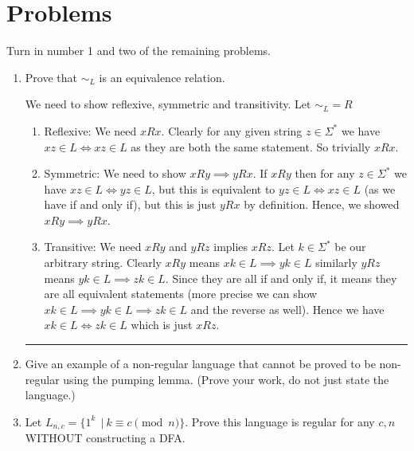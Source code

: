 \documentclass[11pt]{article}
\newenvironment{proof}{{\bf Proof:}}{\hfill\rule{2mm}{2mm}}
\begin{document}
\section{Problems}
Turn in number 1 and two of the remaining problems.
\begin{enumerate}
    \item Prove that $\sim_L$ is an equivalence relation.

        \begin{proof}
            We need to show reflexive, symmetric and transitivity. Let $\sim_L = R$

            \begin{enumerate}
                \item Reflexive: We need $xRx$. Clearly for any given string $z\in \Sigma^{*}$ we have $xz \in L \iff xz \in L$ as they are both the same statement. So trivially $xRx$.
                \item Symmetric: We need to show $xRy \implies yRx$. If $xRy$ then for any $z \in \Sigma^{*}$ we have $xz \in L \iff yz \in L$, but this is equivalent to $yz \in L\iff xz \in L$ (as we have if and only if), but this is just $yRx$ by definition. Hence, we showed $xRy \implies yRx$.
                \item Transitive: We need $xRy$ and $yRz$ implies $xRz$. Let $k \in \Sigma^{*}$ be our arbitrary string.  Clearly $xRy$ means $xk \in L \implies yk \in L$ similarly $yRz$ means $yk \in L \implies zk \in L$. Since they are all if and only if, it means they are all equivalent statements (more precise we can show $xk \in L \implies yk \in L \implies zk \in L$ and the reverse as well). Hence we have $xk \in L \iff zk \in L$ which is just $xRz$.
            \end{enumerate}

            
        \end{proof}
    
    \item Give an example of a non-regular language that cannot be proved to be non-regular using the pumping lemma. (Prove your work, do not just state the language.)


    
    \item Let $L_{n,c} = \{1^k\ ~|~ k \equiv c \pmod n\}$. Prove this language is regular for any $c,n$ WITHOUT constructing a DFA.


\end{enumerate}
\end{document}
